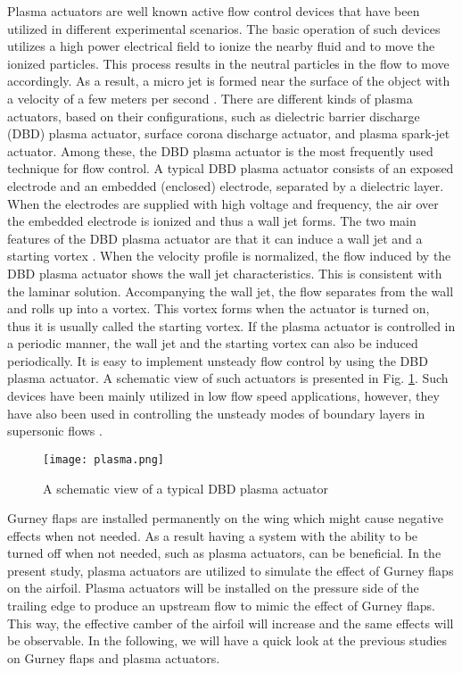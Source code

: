 \documentclass[fleqn,10pt]{SelfArx} %
\begin{document}
Plasma actuators are well known active flow control devices that have been utilized in different experimental scenarios. The basic operation of such devices utilizes a high power electrical field to ionize the nearby fluid and to move the ionized particles. This process results in the neutral particles in the flow to move accordingly. As a result, a micro jet is formed near the surface of the object with a velocity of a few meters per second \cite{Zandsalimy2018}. There are different kinds of plasma actuators, based on their configurations, such as dielectric barrier discharge (DBD) plasma actuator, surface corona discharge actuator, and plasma spark-jet actuator. Among these, the DBD plasma actuator is the most frequently used technique for flow control. A typical DBD plasma actuator consists of an exposed electrode and an embedded (enclosed) electrode, separated by a dielectric layer. When the electrodes are supplied with high voltage and frequency, the air over the embedded electrode is ionized and thus a wall jet forms. The two main features of the DBD plasma actuator are that it can induce a wall jet and a starting vortex \cite{whalley2012starting}. When the velocity profile is normalized, the flow induced by the DBD plasma actuator shows the wall jet characteristics. This is consistent with the laminar solution. Accompanying the wall jet, the flow separates from the wall and rolls up into a vortex. This vortex forms when the actuator is turned on, thus it is usually called the starting vortex. If the plasma actuator is controlled in a periodic manner, the wall jet and the starting vortex can also be induced periodically. It is easy to implement unsteady flow control by using the DBD plasma actuator. A schematic view of such actuators is presented in Fig. \ref{fig_plasma_actuator_1}. Such devices have been mainly utilized in low flow speed applications, however, they have also been used in controlling the unsteady modes of boundary layers in supersonic flows \cite{Joussot2016}.
\begin{figure}[ht]\centering
\texttt{[image: plasma.png]}
\caption{A schematic view of a typical DBD plasma actuator}
\label{fig_plasma_actuator_1}
\end{figure}

Gurney flaps are installed permanently on the wing which might cause negative effects when not needed. As a result having a system with the ability to be turned off when not needed, such as plasma actuators, can be beneficial. In the present study, plasma actuators are utilized to simulate the effect of Gurney flaps on the airfoil. Plasma actuators will be installed on the pressure side of the trailing edge to produce an upstream flow to mimic the effect of Gurney flaps. This way, the effective camber of the airfoil will increase and the same effects will be observable. In the following, we will have a quick look at the previous studies on Gurney flaps and plasma actuators.
\end{document}
